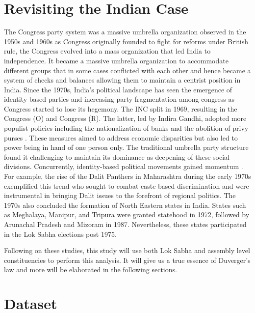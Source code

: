 \section{Revisiting the Indian Case}
The Congress party system \citep{kothari1967india, candland1997congress} was a massive umbrella organization observed in the 1950s and 1960s as Congress originally founded to fight for reforms under British rule, the Congress evolved into a mass organization that led India to independence. It became a massive umbrella organization to accommodate different groups that in some cases conflicted with each other and hence became a system of checks and balances allowing them to maintain a centrist position in India. Since the 1970s, India's political landscape has seen the emergence of identity-based parties and increasing party fragmentation among congress as Congress started to lose its hegemony. The INC  split in 1969, resulting in the Congress (O) and Congress (R). The latter, led by Indira Gandhi, adopted more populist policies including the nationalization of banks and the abolition of privy purses \citep{Guha2011article}. These measures aimed to address economic disparities but also led to power being in hand of one person only. The traditional umbrella party structure found it challenging to maintain its dominance as deepening of these social divisions. Concurrently, identity-based political movements gained momentum \citep{farooqui2016can}. For example, the rise of the Dalit Panthers in Maharashtra during the early 1970s exemplified this trend who sought to combat caste based discrimination and were instrumental in bringing Dalit issues to the forefront of regional politics. The 1970s also concluded the formation of North Eastern states in India. States such as Meghalaya, Manipur, and Tripura were granted statehood in 1972, followed by Arunachal Pradesh and Mizoram in 1987. Nevertheless, these states participated in the Lok Sabha elections post 1975.

\vspace{0.3cm}


Following on these studies, this study will use both Lok Sabha and assembly level constituencies to perform this analysis. It will give us a true essence of Duverger's law and more will be elaborated in the following sections.

\section{Dataset}

